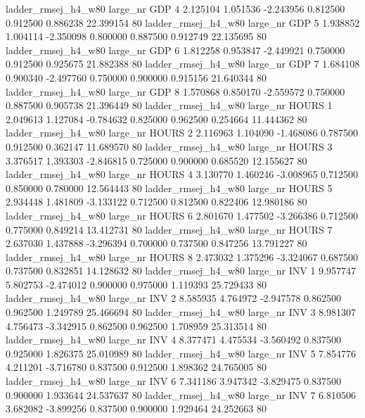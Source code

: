 ladder_rmsej_h4_w80   large_nr      GDP                 4  2.125104  1.051536  -2.243956 0.812500 0.912500  0.886238   22.399154 80
ladder_rmsej_h4_w80   large_nr      GDP                 5  1.938852  1.004114  -2.350098 0.800000 0.887500  0.912749   22.135695 80
ladder_rmsej_h4_w80   large_nr      GDP                 6  1.812258  0.953847  -2.449921 0.750000 0.912500  0.925675   21.882388 80
ladder_rmsej_h4_w80   large_nr      GDP                 7  1.684108  0.900340  -2.497760 0.750000 0.900000  0.915156   21.640344 80
ladder_rmsej_h4_w80   large_nr      GDP                 8  1.570868  0.850170  -2.559572 0.750000 0.887500  0.905738   21.396449 80
ladder_rmsej_h4_w80   large_nr    HOURS                 1  2.049613  1.127084  -0.784632 0.825000 0.962500  0.254664   11.444362 80
ladder_rmsej_h4_w80   large_nr    HOURS                 2  2.116963  1.104090  -1.468086 0.787500 0.912500  0.362147   11.689570 80
ladder_rmsej_h4_w80   large_nr    HOURS                 3  3.376517  1.393303  -2.846815 0.725000 0.900000  0.685520   12.155627 80
ladder_rmsej_h4_w80   large_nr    HOURS                 4  3.130770  1.460246  -3.008965 0.712500 0.850000  0.780000   12.564443 80
ladder_rmsej_h4_w80   large_nr    HOURS                 5  2.934448  1.481809  -3.133122 0.712500 0.812500  0.822406   12.980186 80
ladder_rmsej_h4_w80   large_nr    HOURS                 6  2.801670  1.477502  -3.266386 0.712500 0.775000  0.849214   13.412731 80
ladder_rmsej_h4_w80   large_nr    HOURS                 7  2.637030  1.437888  -3.296394 0.700000 0.737500  0.847256   13.791227 80
ladder_rmsej_h4_w80   large_nr    HOURS                 8  2.473032  1.375296  -3.324067 0.687500 0.737500  0.832851   14.128632 80
ladder_rmsej_h4_w80   large_nr      INV                 1  9.957747  5.802753  -2.474012 0.900000 0.975000  1.119393   25.729433 80
ladder_rmsej_h4_w80   large_nr      INV                 2  8.585935  4.764972  -2.947578 0.862500 0.962500  1.249789   25.466694 80
ladder_rmsej_h4_w80   large_nr      INV                 3  8.981307  4.756473  -3.342915 0.862500 0.962500  1.708959   25.313514 80
ladder_rmsej_h4_w80   large_nr      INV                 4  8.377471  4.475534  -3.560492 0.837500 0.925000  1.826375   25.010989 80
ladder_rmsej_h4_w80   large_nr      INV                 5  7.854776  4.211201  -3.716780 0.837500 0.912500  1.898362   24.765005 80
ladder_rmsej_h4_w80   large_nr      INV                 6  7.341186  3.947342  -3.829475 0.837500 0.900000  1.933644   24.537637 80
ladder_rmsej_h4_w80   large_nr      INV                 7  6.810506  3.682082  -3.899256 0.837500 0.900000  1.929464   24.252663 80
